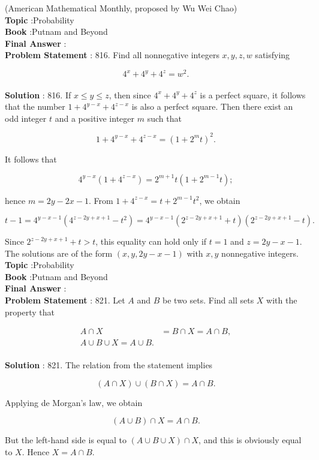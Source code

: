 \documentclass[10pt]{article}
\begin{document}
(American Mathematical Monthly, proposed by Wu Wei Chao) 
\\
\textbf{Topic} :Probability\\
\textbf{Book} :Putnam and Beyond\\
\textbf{Final Answer} :\\


\textbf{Problem Statement} :
816. Find all nonnegative integers $x, y, z, w$ satisfying

$$
4^{x}+4^{y}+4^{z}=w^{2} .
$$
\\
\textbf{Solution} :
816. If $x \leq y \leq z$, then since $4^{x}+4^{y}+4^{z}$ is a perfect square, it follows that the number $1+4^{y-x}+4^{z-x}$ is also a perfect square. Then there exist an odd integer $t$ and a positive integer $m$ such that

$$
1+4^{y-x}+4^{z-x}=\left(1+2^{m} t\right)^{2} .
$$

It follows that

$$
4^{y-x}\left(1+4^{z-x}\right)=2^{m+1} t\left(1+2^{m-1} t\right) ;
$$

hence $m=2 y-2 x-1$. From $1+4^{z-x}=t+2^{m-1} t^{2}$, we obtain

$$
t-1=4^{y-x-1}\left(4^{z-2 y+x+1}-t^{2}\right)=4^{y-x-1}\left(2^{z-2 y+x+1}+t\right)\left(2^{z-2 y+x+1}-t\right) .
$$

Since $2^{z-2 y+x+1}+t>t$, this equality can hold only if $t=1$ and $z=2 y-x-1$. The solutions are of the form $(x, y, 2 y-x-1)$ with $x, y$ nonnegative integers.
\\
\textbf{Topic} :Probability\\
\textbf{Book} :Putnam and Beyond\\
\textbf{Final Answer} :\\


\textbf{Problem Statement} :
821. Let $A$ and $B$ be two sets. Find all sets $X$ with the property that

$$
\begin{aligned}
A \cap X &=B \cap X=A \cap B, \\
A \cup B \cup X=A \cup B .
\end{aligned}
$$
\\
\textbf{Solution} :
821. The relation from the statement implies

$$
(A \cap X) \cup(B \cap X)=A \cap B .
$$

Applying de Morgan's law, we obtain

$$
(A \cup B) \cap X=A \cap B .
$$

But the left-hand side is equal to $(A \cup B \cup X) \cap X$, and this is obviously equal to $X$. Hence $X=A \cap B$.
\end{document}
